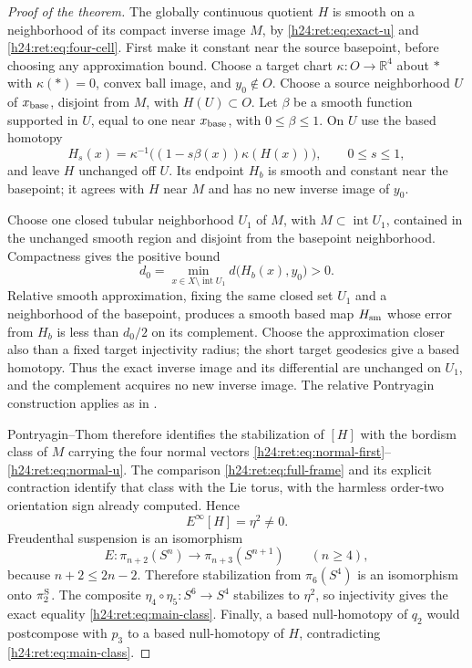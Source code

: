 \begin{proof}[Proof of the theorem]
The globally continuous quotient \(H\) is smooth on a neighborhood
of its compact inverse image \(M\), by
\eqref{h24:ret:eq:exact-u} and \eqref{h24:ret:eq:four-cell}. First make it constant
near the source basepoint, before choosing any approximation bound.
Choose a target chart \(\kappa:O\to\mathbb R^4\) about \(*\) with
\(\kappa(*)=0\), convex ball image, and \(y_0\notin O\).
Choose a source neighborhood \(U\) of \(x_{\rm base}\), disjoint
from \(M\), with \(H(U)\subset O\). Let \(\beta\) be a smooth
function supported in \(U\), equal to one near \(x_{\rm base}\),
with \(0\leq\beta\leq1\). On \(U\) use the based homotopy
\[
 H_s(x)=\kappa^{-1}\bigl((1-s\beta(x))\kappa(H(x))\bigr),
 \qquad 0\leq s\leq1,
\]
and leave \(H\) unchanged off \(U\). Its endpoint \(H_b\) is
smooth and constant near the basepoint; it agrees with \(H\)
near \(M\) and has no new inverse image of \(y_0\).

Choose one closed tubular neighborhood \(U_1\) of \(M\), with
\(M\subset\operatorname{int}U_1\), contained in the unchanged
smooth region and disjoint from the basepoint neighborhood.
Compactness gives the positive bound
\[
 d_0=\min_{x\in X\setminus\operatorname{int}U_1}
             d\bigl(H_b(x),y_0\bigr)>0.
\]
Relative smooth approximation, fixing the same closed set \(U_1\)
and a neighborhood of the basepoint, produces a smooth based map
\(H_{\rm sm}\) whose error from \(H_b\) is less than \(d_0/2\)
on its complement. Choose the approximation closer also than a
fixed target injectivity radius; the short target geodesics give a
based homotopy. Thus the exact inverse image and its differential
are unchanged on \(U_1\), and the complement acquires no new
inverse image. The relative Pontryagin construction applies as in
\cite[\S7, Theorem B and Lemma 4, pp.~43, 48--50]{h24:retbib:Milnor1965}.

Pontryagin--Thom therefore identifies the stabilization of
\([H]\) with the bordism class of \(M\) carrying the four normal
vectors \eqref{h24:ret:eq:normal-first}--\eqref{h24:ret:eq:normal-u}.  The comparison
\eqref{h24:ret:eq:full-frame} and its explicit contraction identify that
class with the Lie torus, with the harmless order-two orientation
sign already computed.  Hence
\[
 E^\infty[H]=\eta^2\ne0.
\]
Freudenthal suspension is an isomorphism
\[
 E:\pi_{n+2}(S^n)\longrightarrow\pi_{n+3}(S^{n+1})
 \qquad(n\geq4),
\]
because \(n+2\leq2n-2\).  Therefore stabilization from
\(\pi_6(S^4)\) is an isomorphism onto \(\pi_2^{\rm S}\).
The composite \(\eta_4\circ\eta_5:S^6\to S^4\) stabilizes to
\(\eta^2\), so injectivity gives the exact equality
\eqref{h24:ret:eq:main-class}.  Finally, a based null-homotopy of \(q_2\)
would postcompose with \(p_3\) to a based null-homotopy of \(H\),
contradicting \eqref{h24:ret:eq:main-class}.
\end{proof}

